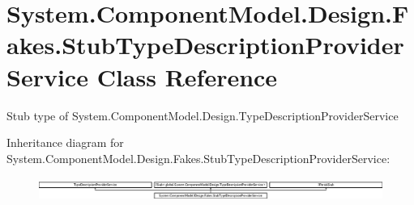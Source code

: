 \hypertarget{class_system_1_1_component_model_1_1_design_1_1_fakes_1_1_stub_type_description_provider_service}{\section{System.\-Component\-Model.\-Design.\-Fakes.\-Stub\-Type\-Description\-Provider\-Service Class Reference}
\label{class_system_1_1_component_model_1_1_design_1_1_fakes_1_1_stub_type_description_provider_service}
}


Stub type of System.\-Component\-Model.\-Design.\-Type\-Description\-Provider\-Service 


Inheritance diagram for System.\-Component\-Model.\-Design.\-Fakes.\-Stub\-Type\-Description\-Provider\-Service\-:\begin{figure}[H]
\begin{center}
\leavevmode
\includegraphics[height=0.771350cm]{class_system_1_1_component_model_1_1_design_1_1_fakes_1_1_stub_type_description_provider_service}
\end{center}
\end{figure}
